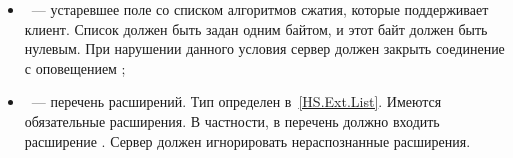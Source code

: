 \begin{itemize}
\item
{}~--- устаревшее поле со списком алгоритмов
сжатия, которые поддерживает клиент. Список должен быть задан одним байтом, 
и этот байт должен быть нулевым. При нарушении данного условия сервер должен 
закрыть соединение с оповещением ;

 
\item
{}~--- перечень расширений. Тип  определен 
в~\ref{HS.Ext.List}. Имеются обязательные расширения. В частности, в перечень 
должно входить расширение .
%
Сервер должен игнорировать нераспознанные расширения.


\end{itemize}

